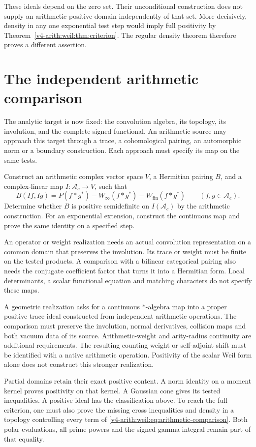 These ideals depend on the zero set. Their unconditional construction
does not supply an arithmetic positive domain independently of that set.
More decisively, density in any one exponential test step would imply
full positivity by Theorem~\ref{v4-arith:weil:thm:criterion}.
The regular density theorem therefore proves a different assertion.

\section{The independent arithmetic comparison}
\label{v4-arith:weil:comparison}

The analytic target is now fixed: the convolution algebra, its topology,
its involution, and the complete signed functional. An arithmetic source
may approach this target through a trace, a cohomological pairing, an
automorphic norm or a boundary construction. Each approach must specify
its map on the same tests.

\begin{question}
\label{v4-arith:weil:qn:comparison}
Construct an arithmetic complex vector space \(V\), a Hermitian pairing
\(B\), and a complex-linear map \(I:\mathscr A_c\to V\), such that
\begin{equation}
 B(If,Ig)=P(f*g^*)-W_\infty(f*g^*)-W_{\mathrm{fin}}(f*g^*)
                   \qquad(f,g\in\mathscr A_c).
 \label{v4-arith:weil:eq:arithmetic-comparison}
\end{equation}
Determine whether \(B\) is positive semidefinite on \(I(\mathscr A_c)\)
by the arithmetic construction. For an exponential extension, construct
the continuous map and prove the same identity on a specified step.
\end{question}

An operator or weight realization needs an actual convolution
representation on a common domain that preserves the involution.
Its trace or weight must be finite on the tested products. A comparison
with a bilinear categorical pairing also needs the conjugate coefficient
factor that turns it into a Hermitian form. Local determinants, a scalar
functional equation and matching characters do not specify these maps.

A geometric realization asks for a continuous \(*\)-algebra map into a
proper positive trace ideal constructed from independent arithmetic
operations. The comparison must preserve the involution, normal
derivatives, collision maps and both vacuum data of its source.
Arithmetic-weight and arity-radius continuity are additional requirements.
The resulting counting weight or self-adjoint shift must be identified
with a native arithmetic operation. Positivity of the scalar Weil form
alone does not construct this stronger realization.

Partial domains retain their exact positive content. A norm identity on
a moment kernel proves positivity on that kernel. A Gaussian cone gives
its tested inequalities. A positive ideal has the classification above.
To reach the full criterion, one must also prove the missing cross
inequalities and density in a topology controlling every term of
\eqref{v4-arith:weil:eq:arithmetic-comparison}.
Both polar evaluations, all prime powers and the signed gamma integral
remain part of that equality.
